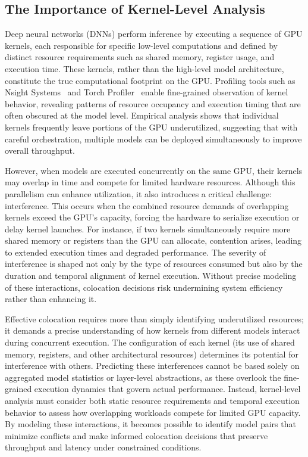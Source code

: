 \subsection{The Importance of Kernel-Level Analysis}

Deep neural networks (DNNs) perform inference by executing a sequence of GPU kernels, each responsible for specific low-level computations and defined by distinct resource requirements such as shared memory, register usage, and execution time. These kernels, rather than the high-level model architecture, constitute the true computational footprint on the GPU. Profiling tools such as Nsight Systems~\cite{nsight_systems} and Torch Profiler~\cite{torch_profiler} enable fine-grained observation of kernel behavior, revealing patterns of resource occupancy and execution timing that are often obscured at the model level. Empirical analysis shows that individual kernels frequently leave portions of the GPU underutilized, suggesting that with careful orchestration, multiple models can be deployed simultaneously to improve overall throughput.

However, when models are executed concurrently on the same GPU, their kernels may overlap in time and compete for limited hardware resources. Although this parallelism can enhance utilization, it also introduces a critical challenge: interference. This occurs when the combined resource demands of overlapping kernels exceed the GPU's capacity, forcing the hardware to serialize execution or delay kernel launches. For instance, if two kernels simultaneously require more shared memory or registers than the GPU can allocate, contention arises, leading to extended execution times and degraded performance. The severity of interference is shaped not only by the type of resources consumed but also by the duration and temporal alignment of kernel execution. Without precise modeling of these interactions, colocation decisions risk undermining system efficiency rather than enhancing it.

Effective colocation requires more than simply identifying underutilized resources; it demands a precise understanding of how kernels from different models interact during concurrent execution. The configuration of each kernel (its use of shared memory, registers, and other architectural resources) determines its potential for interference with others. Predicting these interferences cannot be based solely on aggregated model statistics or layer-level abstractions, as these overlook the fine-grained execution dynamics that govern actual performance. Instead, kernel-level analysis must consider both static resource requirements and temporal execution behavior to assess how overlapping workloads compete for limited GPU capacity. By modeling these interactions, it becomes possible to identify model pairs that minimize conflicts and make informed colocation decisions that preserve throughput and latency under constrained conditions.

